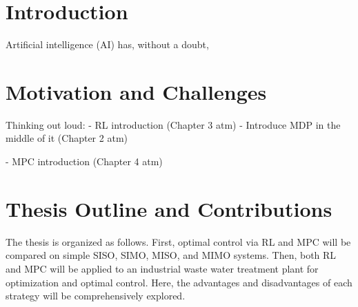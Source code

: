 \section{Introduction}
Artificial intelligence (AI) has, without a doubt, 


\section{Motivation and Challenges}

Thinking out loud:
- RL introduction (Chapter 3 atm)
    - Introduce MDP in the middle of it (Chapter 2 atm)

- MPC introduction (Chapter 4 atm)

\section{Thesis Outline and Contributions}
The thesis is organized as follows.  First, optimal control via RL and MPC will be compared on simple SISO, SIMO, MISO, and MIMO systems.  Then, both RL and MPC will be applied to an industrial waste water treatment plant for optimization and optimal control. Here, the advantages and disadvantages of each strategy will be comprehensively explored.










